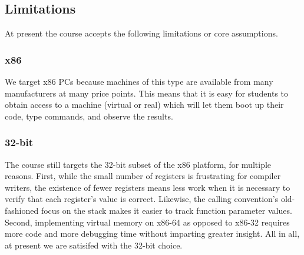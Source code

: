 
\subsection{Limitations}

At present the course accepts the following limitations
or core assumptions.

\subsubsection{x86}

We target x86 PCs because machines of this type are
available from many manufacturers at many price points.
This means that it is easy for students to obtain access
to a machine (virtual or real) which will let them boot
up their code, type commands, and observe the results.

\subsubsection{32-bit}

The course still targets the 32-bit
subset of the x86 platform, for multiple reasons.
First, while the small number of registers is
frustrating for compiler writers,
the existence of fewer registers means less work
when it is necessary to verify that each register's
value is correct.
Likewise, the calling convention's old-fashioned focus on the stack
makes it easier to track function parameter values.
Second, implementing virtual memory on x86-64 as
opposed to x86-32 requires more code and more
debugging time without imparting greater insight.
All in all, at present we are satisifed with
the 32-bit choice.

